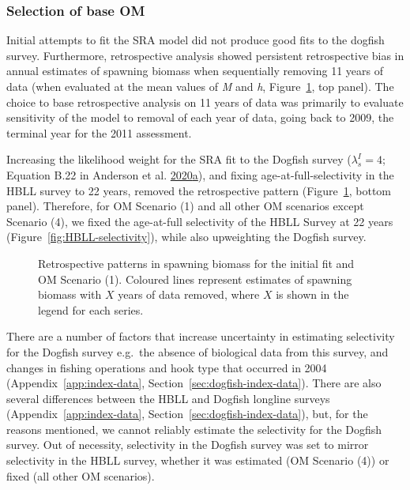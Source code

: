 \documentclass[11pt]{book}
\begin{document}
\hypertarget{sec:approach3-conditioning-base-om}{%
\subsubsection{Selection of base OM}\label{sec:approach3-conditioning-base-om}}

Initial attempts to fit the SRA model did not produce good fits to the dogfish survey. Furthermore, retrospective analysis showed persistent retrospective bias in annual estimates of spawning biomass when sequentially removing 11 years of data (when evaluated at the mean values of \emph{M} and \emph{h}, Figure~\ref{fig:retro-initial}, top panel). The choice to base retrospective analysis on 11 years of data was primarily to evaluate sensitivity of the model to removal of each year of data, going back to 2009, the terminal year for the 2011 assessment.

Increasing the likelihood weight for the SRA fit to the Dogfish survey (\(\lambda^I_s = 4\); Equation B.22 in Anderson et al. \protect\hyperlink{ref-anderson2020gfmp}{2020}\protect\hyperlink{ref-anderson2020gfmp}{a}), and fixing age-at-full-selectivity in the HBLL survey to 22 years, removed the retrospective pattern (Figure~\ref{fig:retro-initial}, bottom panel). Therefore, for OM Scenario (1) and all other OM scenarios except Scenario (4), we fixed the age-at-full selectivity of the HBLL Survey at 22 years (Figure~\ref{fig:HBLL-selectivity}), while also upweighting the Dogfish survey.


\begin{figure}[htb]

{\centering {} 

}

\caption{Retrospective patterns in spawning biomass for the initial fit and OM Scenario (1). Coloured lines represent estimates of spawning biomass with \(X\) years of data removed, where \(X\) is shown in the legend for each series.}\label{fig:retro-initial}
\end{figure}
There are a number of factors that increase uncertainty in estimating selectivity for the Dogfish survey e.g.~the absence of biological data from this survey, and changes in fishing operations and hook type that occurred in 2004 (Appendix~\ref{app:index-data}, Section~\ref{sec:dogfish-index-data}). There are also several differences between the HBLL and Dogfish longline surveys (Appendix~\ref{app:index-data}, Section~\ref{sec:dogfish-index-data}), but, for the reasons mentioned, we cannot reliably estimate the selectivity for the Dogfish survey. Out of necessity, selectivity in the Dogfish survey was set to mirror selectivity in the HBLL survey, whether it was estimated (OM Scenario (4)) or fixed (all other OM scenarios).
\end{document}
